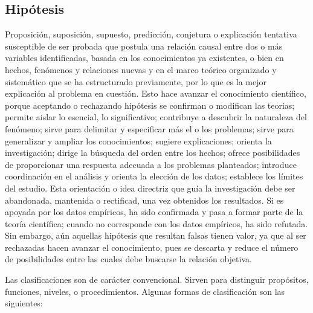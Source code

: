 \subsection{Hipótesis}

Proposición, suposición, supuesto, predicción, conjetura o explicación tentativa susceptible de ser probada que postula una relación causal entre dos o más variables identificadas, basada en los conocimientos ya existentes, o bien en hechos, fenómenos y relaciones nuevas y en el marco teórico organizado y sistemático que se ha estructurado previamente, por lo que es la mejor explicación al problema en cuestión. Esto hace avanzar el conocimiento científico, porque aceptando o rechazando hipótesis se confirman o modifican las teorías; permite aislar lo esencial, lo significativo; contribuye a descubrir la naturaleza del fenómeno; sirve para delimitar y especificar más el o los problemas; sirve para generalizar y ampliar los conocimientos; sugiere explicaciones; orienta la investigación; dirige la búsqueda del orden entre los hechos; ofrece posibilidades de proporcionar una respuesta adecuada a los problemas planteados; introduce coordinación en el análisis y orienta la elección de los datos; establece los límites del estudio. Esta orientación o idea directriz que guía la investigación debe ser abandonada, mantenida o rectificad, una vez obtenidos los resultados. Si es apoyada por los datos empíricos, ha sido confirmada y pasa a formar parte de la teoría científica; cuando no corresponde con los datos empíricos, ha sido refutada. Sin embargo, aún aquellas hipótesis que resultan falsas tienen valor, ya que al ser rechazadas hacen avanzar el conocimiento, pues se descarta y reduce el número de posibilidades entre las cuales debe buscarse la relación objetiva.

Las clasificaciones son de carácter convencional. Sirven para distinguir propósitos, funciones, niveles, o procedimientos. Algunas formas de clasificación son las siguientes:

